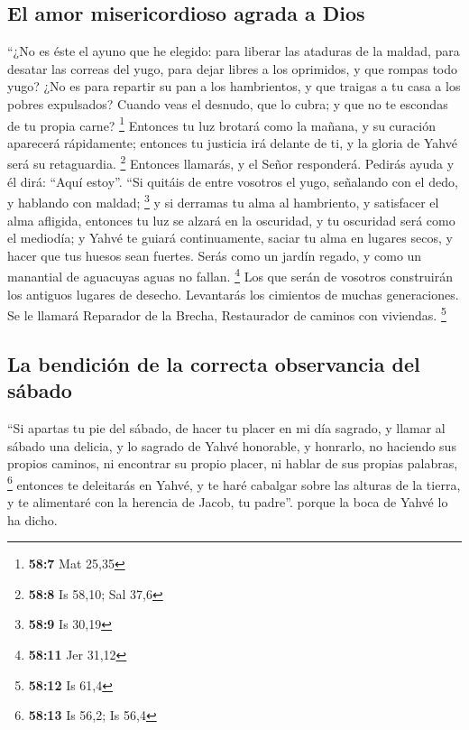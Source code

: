 \hypertarget{el-amor-misericordioso-agrada-a-dios}{%
\subsection{El amor misericordioso agrada a
Dios}\label{el-amor-misericordioso-agrada-a-dios}}

 ``¿No es éste el ayuno que he elegido: para liberar las
ataduras de la maldad, para desatar las correas del yugo, para dejar
libres a los oprimidos, y que rompas todo yugo?  ¿No es
para repartir su pan a los hambrientos, y que traigas a tu casa a los
pobres expulsados? Cuando veas el desnudo, que lo cubra; y que no te
escondas de tu propia carne? \footnote{\textbf{58:7} Mat 25,35}
 Entonces tu luz brotará como la mañana, y su curación
aparecerá rápidamente; entonces tu justicia irá delante de ti, y la
gloria de Yahvé será su retaguardia. \footnote{\textbf{58:8} Is 58,10;
  Sal 37,6}  Entonces llamarás, y el Señor responderá.
Pedirás ayuda y él dirá: ``Aquí estoy''. ``Si quitáis de entre vosotros
el yugo, señalando con el dedo, y hablando con maldad; \footnote{\textbf{58:9}
  Is 30,19}  y si derramas tu alma al hambriento, y
satisfacer el alma afligida, entonces tu luz se alzará en la oscuridad,
y tu oscuridad será como el mediodía;  y Yahvé te guiará
continuamente, saciar tu alma en lugares secos, y hacer que tus huesos
sean fuertes. Serás como un jardín regado, y como un manantial de
aguacuyas aguas no fallan. \footnote{\textbf{58:11} Jer 31,12}
 Los que serán de vosotros construirán los antiguos
lugares de desecho. Levantarás los cimientos de muchas generaciones. Se
le llamará Reparador de la Brecha, Restaurador de caminos con viviendas.
\footnote{\textbf{58:12} Is 61,4}

\hypertarget{la-bendiciuxf3n-de-la-correcta-observancia-del-suxe1bado}{%
\subsection{La bendición de la correcta observancia del
sábado}\label{la-bendiciuxf3n-de-la-correcta-observancia-del-suxe1bado}}

 ``Si apartas tu pie del sábado, de hacer tu placer en mi
día sagrado, y llamar al sábado una delicia, y lo sagrado de Yahvé
honorable, y honrarlo, no haciendo sus propios caminos, ni encontrar su
propio placer, ni hablar de sus propias palabras, \footnote{\textbf{58:13}
  Is 56,2; Is 56,4}  entonces te deleitarás en Yahvé, y
te haré cabalgar sobre las alturas de la tierra, y te alimentaré con la
herencia de Jacob, tu padre''. porque la boca de Yahvé lo ha dicho.

